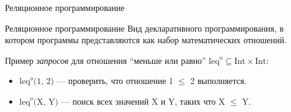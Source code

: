 \documentclass[xcolor=table]{beamer}
\begin{document}
\begin{frame}{Реляционное программирование}
  \begin{block}{Реляционное программирование}
      Вид декларативного программирования, в котором программы
      представляются как набор математических отношений.
  \end{block}
   \vspace{0.4cm}
   \begin{block}{}
   Пример {\it запросов} для отношения ``меньше или равно'' $\text{leq}^o \subseteq \text{Int} \times \text{Int}$:
   \begin{itemize}
   \item $\text{leq}^o\text{(1, 2)}$ --- проверить, что отношение 1 $\leq$ 2 выполняется. %
   \item $\text{leq}^o\text{(X, Y)}$ --- поиск всех значений X и Y, таких что X $\leq$ Y.
   \end{itemize}
   \end{block}

\end{frame}
\end{document}
